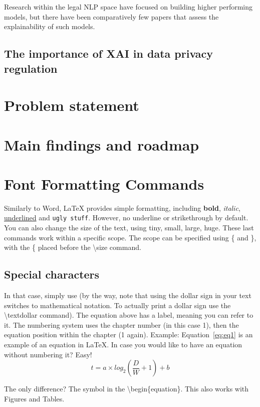 Research within the legal NLP space have focused on building higher performing models, but there have been comparatively few papers that assess the explainability of such models.

\subsection{The importance of XAI in data privacy regulation}


\section{Problem statement}

\section{Main findings and roadmap}


\section{Font Formatting Commands}
Similarly to Word, LaTeX provides simple formatting, including \textbf{bold}, \textit{italic}, \underline{underlined} and \texttt{ugly stuff}.
However, no underline or strikethrough by default.
You can also change the size of the text, using {\tiny tiny}, {\small small}, {\large large}, {\huge huge}.
These last commands work within a specific scope.
The scope can be specified using \{ and \}, with the \{ placed before the \textbackslash{}size command.

\subsection{Special characters}
In that case, simply use \textdollar{} (by the way, note that using the dollar sign in your text switches to mathematical notation. To actually print a dollar sign use the \textbackslash{}textdollar command).
The equation above has a label, meaning you can refer to it. The numbering system uses the chapter number (in this case 1), then the equation position within the chapter (1 again).
Example: Equation~\ref{eq:eq1} is an example of an equation in LaTeX{}.
In case you would like to have an equation without numbering it? Easy!
\begin{equation*}
t = a \times log_{2}(\frac{D}{W} + 1) + b
\end{equation*}

The only difference? The \textasteriskcentered{}  symbol in the \textbackslash{}begin\{equation\textbf{\textasteriskcentered}\}.
This also works with Figures and Tables.


